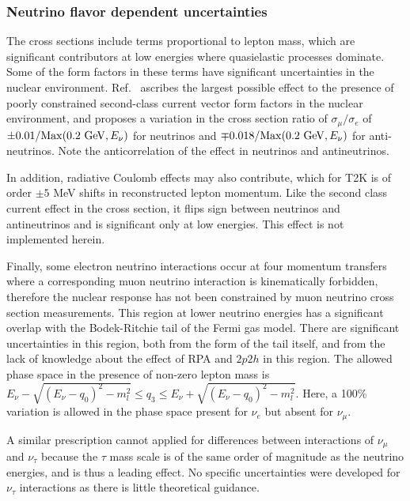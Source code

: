 \subsubsection{Neutrino flavor dependent uncertainties}
The cross sections include terms proportional to lepton mass, which are significant contributors at low energies where quasielastic processes dominate.  Some of the form factors in these terms have significant uncertainties in the nuclear environment.  Ref.~\cite{Day-McFarland:2012} ascribes the largest possible effect to the presence of poorly constrained second-class current vector form factors in the nuclear environment, and proposes a variation in the cross section ratio of $\sigma_\mu/\sigma_e$ of $\pm 0.01/{\rm\textstyle Max}(0.2~{\rm\textstyle GeV},E_\nu)$ for neutrinos and $\mp 0.018/{\rm\textstyle Max}(0.2~ {\rm\textstyle GeV},E_\nu)$ for anti-neutrinos.  Note the anticorrelation of the effect in neutrinos and antineutrinos.

In addition, radiative Coulomb effects may also contribute, which for T2K is of order $\pm5$ MeV shifts in reconstructed lepton momentum.  Like the second class current effect in the cross section, it flips sign between neutrinos and antineutrinos and is significant only at low energies.  This effect is not implemented herein.

Finally, some electron neutrino interactions occur at four momentum transfers where a corresponding muon neutrino interaction is kinematically forbidden, therefore the nuclear response has not been constrained by muon neutrino cross section measurements.  This region at lower neutrino energies has a significant overlap with the Bodek-Ritchie tail of the Fermi gas model. There are significant uncertainties in this region, both from the form of the tail itself, and from the lack of knowledge about the effect of RPA and $2p2h$ in this region. The allowed phase space in the presence of non-zero lepton mass is $E_\nu-\sqrt{\left( E_\nu-q_0\right) ^2-m_l^2}\leq q_3\leq E_\nu+\sqrt{\left( E_\nu-q_0\right) ^2-m_l^2}$. Here, a 100\% variation is allowed in the phase space present for $\nu_e$ but absent for $\nu_\mu$.

A similar prescription cannot applied for differences between interactions of $\nu_\mu$ and $\nu_\tau$ because the $\tau$ mass scale is of the same order of magnitude as the neutrino energies, and is thus a leading effect. No specific uncertainties were developed for $\nu_\tau$ interactions as there is little theoretical guidance.%

